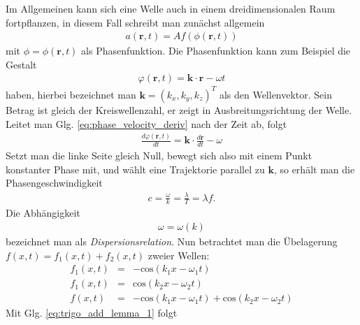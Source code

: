 \documentclass{book}
\renewcommand{\cos}{\text{cos}}
\begin{document}
Im Allgemeinen kann sich eine Welle auch in einem dreidimensionalen Raum fortpflanzen, in diesem Fall schreibt man zunächst allgemein
%
\begin{eqnarray}
a\left(\mathbf{r}, t\right) = Af\left(\phi\left(\mathbf{r}, t\right)\right)
\end{eqnarray}
%
mit $\phi = \phi\left(\mathbf{r}, t\right)$ als Phasenfunktion. Die Phasenfunktion kann zum Beispiel die Gestalt
%
\begin{eqnarray}
\varphi\left(\mathbf{r}, t\right) = \mathbf{k}\cdot\mathbf{r} - \omega t\label{eq:phase_velocity_deriv}
\end{eqnarray}
%
haben, hierbei bezeichnet man $\mathbf{k} = \left(k_x, k_y, k_z\right)^T$ als den Wellenvektor. Sein Betrag ist gleich der Kreiswellenzahl, er zeigt in Ausbreitungsrichtung der Welle. Leitet man Glg. \eqref{eq:phase_velocity_deriv} nach der Zeit ab, folgt
%
\begin{eqnarray}
\frac{d\varphi\left(\mathbf{r}, t\right)}{dt} = \mathbf{k}\cdot\frac{d\mathbf{r}}{dt} - \omega
\end{eqnarray}
%
Setzt man die linke Seite gleich Null, bewegt sich also mit einem Punkt konstanter Phase mit, und wählt eine Trajektorie parallel zu $\mathbf{k}$, so erhält man die Phasengeschwindigkeit
%
\begin{eqnarray}
c = \frac{\omega}{k} = \frac{\lambda}{T} = \lambda f.
\end{eqnarray}
%
Die Abhängigkeit
%
\begin{eqnarray}
\omega = \omega\left(k\right)
\end{eqnarray}
%
bezeichnet man als \textit{Dispersionsrelation}. Nun betrachtet man die Übelagerung $f\left(x, t\right) = f_1\left(x, t\right) + f_2\left(x, t\right)$ zweier Wellen:
%
\begin{eqnarray}
f_1\left(x, t\right) & = & -\cos\left(k_1x - \omega_1t\right)\\
f_1\left(x, t\right) & = & \cos\left(k_2x - \omega_2t\right)\\
f\left(x, t\right) & = & -\cos\left(k_1x - \omega_1t\right) + \cos\left(k_2x - \omega_2t\right)
\end{eqnarray}
%
Mit Glg. \eqref{eq:trigo_add_lemma_1} folgt
%
\end{document}
